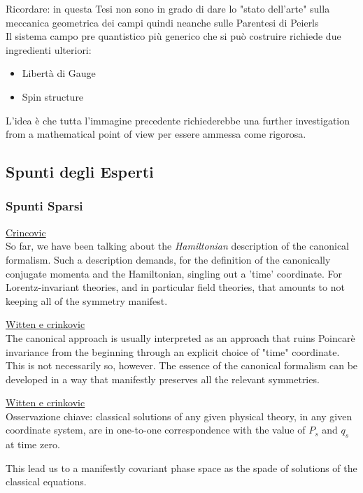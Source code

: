 \documentclass[Cascione]{subfiles}
\begin{document}
	\begin{Warning}
		Ricordare: in questa Tesi non sono in grado di dare lo "stato dell'arte"  sulla meccanica geometrica dei campi quindi neanche sulle Parentesi di Peierls\\
		Il sistema campo pre quantistico più generico che si può costruire richiede due ingredienti ulteriori:
			\begin{itemize}
				\item Libertà di Gauge
				\item Spin structure
			\end{itemize}		
			L'idea è che tutta l'immagine precedente richiederebbe una further investigation from a mathematical point of view per essere ammessa come rigorosa.
	\end{Warning}
		
		
	\subsection{Spunti degli Esperti}
	
		\subsubsection{Spunti Sparsi}
	
			\begin{Warning}
			\underline{Crincovic}\cite{Crnkovic1999}\\
			So far, we have been talking about the \emph{Hamiltonian} description of the canonical formalism.
			Such a description demands, for the definition of the canonically conjugate momenta and the Hamiltonian, singling out a 'time' coordinate. 
			For Lorentz-invariant theories, and in particular field theories, that amounts to not keeping all of the symmetry manifest. 
		\end{Warning}
		
		\begin{Warning}
			\underline{Witten e crinkovic}\\
			The canonical approach is usually interpreted as an approach that ruins Poincarè invariance from the beginning through an explicit choice of "time" coordinate.
			This is not necessarily so, however. The essence of the canonical formalism can be developed in a way that manifestly preserves all the relevant symmetries.		
		\end{Warning}
		
		\begin{Warning}
			\underline{Witten e crinkovic}\\
			Osservazione chiave:
			classical solutions of any given physical theory, in any given coordinate system, are in one-to-one correspondence with the value of $P_s$ and $q_s$ at time zero.
			
			This lead us to a manifestly covariant phase space as the spade of solutions of the classical equations.
		\end{Warning}
		
\end{document}
